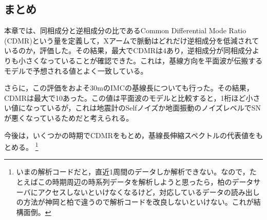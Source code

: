 \subsection{まとめ}
本章では、同相成分と逆相成分の比であるCommon Differential Mode Ratio (CDMR)という量を定義して，Xアームで脈動はどれだけ逆相成分を低減されているのか，評価した。その結果，最大でCDMRは4あり，逆相成分が同相成分よりも小さくなっていることが確認できた。これは，基線方向を平面波が伝搬するモデルで予想される値とよく一致している。

さらに，この評価をおよそ30mのIMCの基線長についても行った。その結果，CDMRは最大で10あった。この値は平面波のモデルと比較すると，1桁ほど小さい値になっているが，これは地震計のSelfノイズか地面振動のノイズレベルでSNが悪くなっているためだと考えられる。

今後は，いくつかの時期でCDMRをもとめ，基線長伸縮スペクトルの代表値をもとめる。 \footnote[13]{いまの解析コードだと，直近1周間のデータしか解析できない。なので，たとえばこの時期周辺の時系列データを解析しようと思ったら，柏のデータサーバにアクセスしないといけなくなるけど，対応しているデータの読み出しの方法が神岡と柏で違うので解析コードを改良しないといけない。これが結構面倒。}
